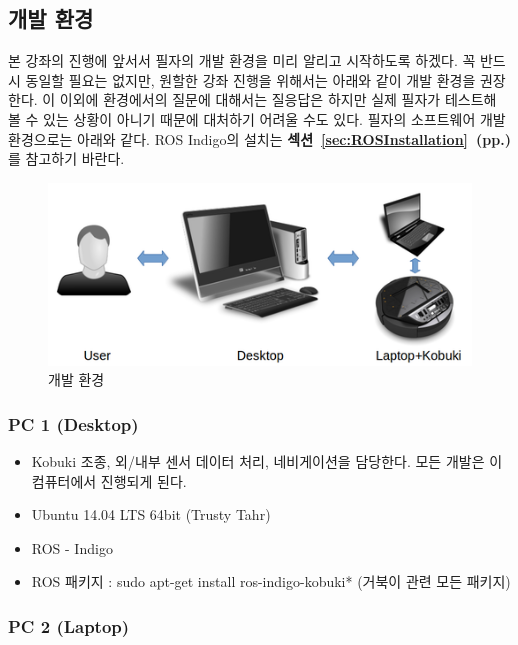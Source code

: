 \subsection{개발 환경}

본 강좌의 진행에 앞서서 필자의 개발 환경을 미리 알리고 시작하도록 하겠다. 꼭 반드시 동일할 필요는 없지만, 원할한 강좌 진행을 위해서는 아래와 같이 개발 환경을 권장한다. 이 이외에 환경에서의 질문에 대해서는 질응답은 하지만 실제 필자가 테스트해 볼 수 있는 상황이 아니기 때문에 대처하기 어려울 수도 있다. 필자의 소프트웨어 개발환경으로는 아래와 같다. ROS Indigo의 설치는 \textbf{섹션~\ref{sec:ROSInstallation}~(pp.\pageref{sec:ROSInstallation})}를 참고하기 바란다.

\begin{figure}[h]
\centering\includegraphics[width=0.8\columnwidth]{pictures/chapter10/develop_environment.png}
\caption{개발 환경}
\end{figure}

\subsubsection{PC 1 (Desktop)}

\begin{itemize}[leftmargin=*]
\item Kobuki 조종, 외/내부 센서 데이터 처리, 네비게이션을 담당한다. 모든 개발은 이 컴퓨터에서 진행되게 된다.
\item Ubuntu 14.04 LTS 64bit (Trusty Tahr)
\item ROS - Indigo
\item ROS 패키지 : sudo apt-get install ros-indigo-kobuki* (거북이 관련 모든 패키지)
\end{itemize}

\subsubsection{PC 2 (Laptop)}


